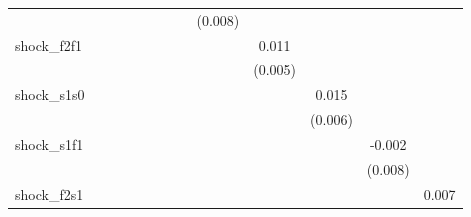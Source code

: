 {\begin{tabular}{l*{12}{c}}
            &                     &                     &                     &                     &                     &                     &                     &     (0.008)         &                     &                     &                     &                     \\
\addlinespace
shock\_f2f1  &                     &                     &                     &                     &                     &                     &                     &                     &       0.011\sym{*}  &                     &                     &                     \\
            &                     &                     &                     &                     &                     &                     &                     &                     &     (0.005)         &                     &                     &                     \\
\addlinespace
shock\_s1s0  &                     &                     &                     &                     &                     &                     &                     &                     &                     &       0.015\sym{**} &                     &                     \\
            &                     &                     &                     &                     &                     &                     &                     &                     &                     &     (0.006)         &                     &                     \\
\addlinespace
shock\_s1f1  &                     &                     &                     &                     &                     &                     &                     &                     &                     &                     &      -0.002         &                     \\
            &                     &                     &                     &                     &                     &                     &                     &                     &                     &                     &     (0.008)         &                     \\
\addlinespace
shock\_f2s1  &                     &                     &                     &                     &                     &                     &                     &                     &                     &                     &                     &       0.007         \\

\end{tabular}}
